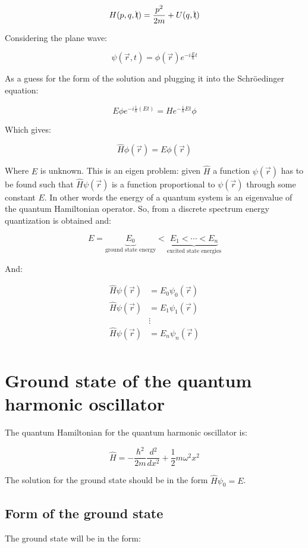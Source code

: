 $$H(p,q, \bcancel{t}) = \frac{p^2}{2m}+U(q,\bcancel{t})$$

Considering the plane wave:

$$\psi(\vec{r}, t) = \phi(\vec{r}) e^{-i \frac{E}{\hbar}t}$$

As a guess for the form of the solution and plugging it into the Schr\"oedinger equation:

$$E\phi e^{-i \frac{i}{\hbar}(Et)} = He^{-\frac{i}{\hbar}Et}\phi$$

Which gives:

$$\hat{H}\phi(\vec{r}) = E\phi(\vec{r})$$

Where $E$ is unknown.
This is an eigen problem: given $\hat{H}$ a function $\psi(\vec{r})$ has to be found such that $\hat{H}\psi(\vec{r})$ is a function proportional to $\psi(\vec{r})$ through some constant $E$.
In other words the energy of a quantum system is an eigenvalue of the quantum Hamiltonian operator.
So, from a discrete spectrum energy quantization is obtained and:

$$E = \underbrace{E_0}_{\text{ground state energy}} < \underbrace{E_1 < \cdots < E_n}_{\text{excited state energies}}$$

And:

\begin{align*}
  \hat{H}\psi(\vec{r}) &= E_0\psi_0(\vec{r})\\
  \hat{H}\psi(\vec{r}) &= E_1\psi_1(\vec{r})\\
                       &\vdots\\
  \hat{H}\psi(\vec{r}) &= E_n\psi_n(\vec{r})\\
\end{align*}

\section{Ground state of the quantum harmonic oscillator}
The quantum Hamiltonian for the quantum harmonic oscillator is:

$$\hat{H} = - \frac{\hbar^2}{2m}\frac{d{^2}}{d{x^2}} +\frac{1}{2}m\omega^2 x^2$$

The solution for the ground state should be in the form $\hat{H}\psi_0 = E$.

  \subsection{Form of the ground state}
  The ground state will be in the form:

